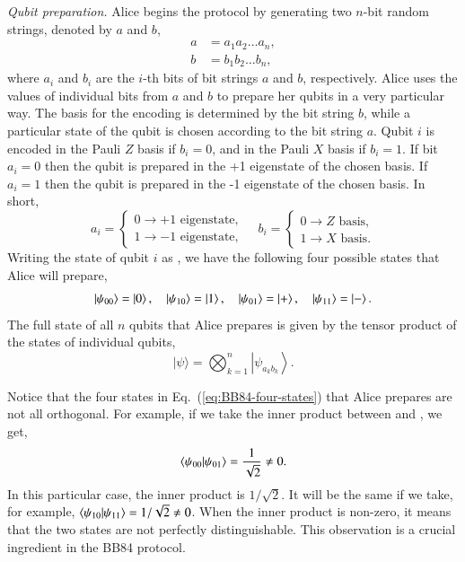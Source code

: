 \emph{Qubit preparation.}
Alice begins the protocol by generating two $n$-bit random strings, denoted by $a$ and $b$,
\begin{align}
    a & = a_1 a_2 \ldots a_n, \\
    b & = b_1 b_2 \ldots b_n,
\end{align}
where $a_i$ and $b_i$ are the $i$-th bits of bit strings $a$ and $b$, respectively.
Alice uses the values of individual bits from $a$ and $b$ to prepare her qubits in a very particular way.
The basis for the encoding is determined by the bit string $b$, while a particular state of the qubit is chosen according to the bit string $a$.
Qubit $i$ is encoded in the Pauli $Z$ basis if $b_i=0$, and in the Pauli $X$ basis if $b_i=1$.
If bit $a_i=0$ then the qubit is prepared in the +1 eigenstate of the chosen basis.
If $a_i=1$ then the qubit is prepared in the -1 eigenstate of the chosen basis.
In short,
\begin{equation}
    a_i = \begin{cases}
        0 \rightarrow +1\text{ eigenstate}, \\
        1 \rightarrow -1\text{ eigenstate},
    \end{cases}
    \quad
    b_i = \begin{cases}
        0 \rightarrow Z\text{ basis}, \\
        1 \rightarrow X\text{ basis}.
    \end{cases}
\end{equation}
Writing the state of qubit $i$ as , we have the following four possible states that Alice will prepare,
\begin{equation}
    \ket{\psi_{00}} = \ket{0}, \quad \ket{\psi_{10}} = \ket{1}, \quad \ket{\psi_{01}} = \ket{+}, \quad \ket{\psi_{11}} = \ket{-}.
    \label{eq:BB84-four-states}
\end{equation}
The full state of all $n$ qubits that Alice prepares is given by the tensor product of the states of individual qubits,
\begin{equation}
    |\psi\rangle=\bigotimes_{k=1}^n\left|\psi_{a_k b_k}\right\rangle.
\end{equation}

Notice that the four states in Eq.~(\ref{eq:BB84-four-states}) that Alice prepares are not all orthogonal.
For example, if we take the inner product between  and , we get,
\begin{equation}
    \langle \psi_{00}|\psi_{01} \rangle =\frac{1}{\sqrt{2}} \neq 0.
\end{equation}
In this particular case, the inner product is $1/\sqrt{2}$. It will be the same if we take, for example, 
$\langle \psi_{10}|\psi_{11} \rangle = 1/\sqrt{2} \ne 0$.
When the inner product is non-zero, it means that the two states are not perfectly distinguishable.
This observation is a crucial ingredient in the BB84 protocol. 

